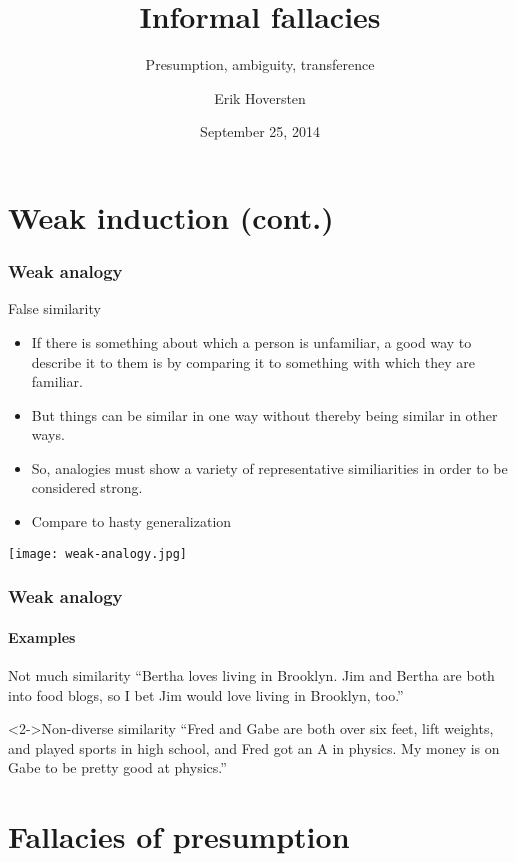 \documentclass[10pt,letterpaper,xcolor=dvipsnames,handout]{beamer}
\title{Informal fallacies}
\subtitle{Presumption, ambiguity, transference}
\author[Hoversten]{Erik Hoversten}
\institute[lrp-f14]{Logic, reason, and persuasion: fall 2014 \\ Rutgers University}
\date[09/25/2014]{September 25, 2014}
\begin{document}
\begin{frame}
\titlepage
\end{frame}

\section{Weak induction (cont.)}

\begin{frame}
  \frametitle{Weak analogy}
  
  \begin{block}{False similarity}
    \begin{itemize}
      \item If there is something about which a person is unfamiliar, a good way to describe it to them is by comparing it to something with which they are familiar.
      \item But things can be similar in one way without thereby being similar in other ways.
      \item So, analogies must show a variety of representative similiarities in order to be considered strong.
      \item Compare to hasty generalization
    \end{itemize}
  \end{block}
  
    \begin{center}
    \texttt{[image: weak-analogy.jpg]}
  \end{center}
  
\end{frame}

\begin{frame}
  \frametitle{Weak analogy}
  \framesubtitle{Examples}
  
  \begin{block}{Not much similarity}
    ``Bertha loves living in Brooklyn.  Jim and Bertha are both into food blogs, so I bet Jim would love living in Brooklyn, too.''
  \end{block}
  
  \begin{block}<2->{Non-diverse similarity}
    ``Fred and Gabe are both over six feet, lift weights, and played sports in high school, and Fred got an A in physics.  My money is on Gabe to be pretty good at physics.''
  \end{block}
  
\end{frame}

\section{Fallacies of presumption}
\end{document}
